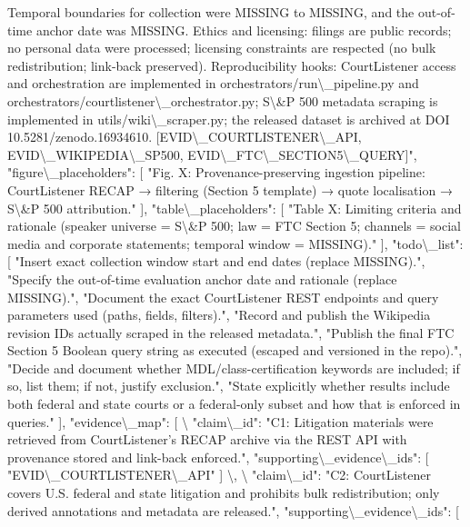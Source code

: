 {Temporal boundaries for collection were MISSING to MISSING, and the out-of-time anchor date was MISSING. Ethics and licensing: filings are public records; no personal data were processed; licensing constraints are respected (no bulk redistribution; link-back preserved). Reproducibility hooks: CourtListener access and orchestration are implemented in orchestrators/run\textbackslash{}_pipeline.py and orchestrators/courtlistener\textbackslash{}_orchestrator.py; S\textbackslash{}&P 500 metadata scraping is implemented in utils/wiki\textbackslash{}_scraper.py; the released dataset is archived at DOI 10.5281/zenodo.16934610. [EVID\textbackslash{}_COURTLISTENER\textbackslash{}_API, EVID\textbackslash{}_WIKIPEDIA\textbackslash{}_SP500, EVID\textbackslash{}_FTC\textbackslash{}_SECTION5\textbackslash{}_QUERY]",
"figure\textbackslash{}_placeholders": [
"Fig. X: Provenance-preserving ingestion pipeline: CourtListener RECAP → filtering (Section 5 template) → quote localisation → S\textbackslash{}&P 500 attribution."
],
"table\textbackslash{}_placeholders": [
"Table X: Limiting criteria and rationale (speaker universe = S\textbackslash{}&P 500; law = FTC Section 5; channels = social media and corporate statements; temporal window = MISSING)."
],
"todo\textbackslash{}_list": [
"Insert exact collection window start and end dates (replace MISSING).",
"Specify the out-of-time evaluation anchor date and rationale (replace MISSING).",
"Document the exact CourtListener REST endpoints and query parameters used (paths, fields, filters).",
"Record and publish the Wikipedia revision IDs actually scraped in the released metadata.",
"Publish the final FTC Section 5 Boolean query string as executed (escaped and versioned in the repo).",
"Decide and document whether MDL/class-certification keywords are included; if so, list them; if not, justify exclusion.",
"State explicitly whether results include both federal and state courts or a federal-only subset and how that is enforced in queries."
],
"evidence\textbackslash{}_map": [
\textbackslash{}{
"claim\textbackslash{}_id": "C1: Litigation materials were retrieved from CourtListener's RECAP archive via the REST API with provenance stored and link-back enforced.",
"supporting\textbackslash{}_evidence\textbackslash{}_ids": [
"EVID\textbackslash{}_COURTLISTENER\textbackslash{}_API"
]
\textbackslash{}},
\textbackslash{}{
"claim\textbackslash{}_id": "C2: CourtListener covers U.S. federal and state litigation and prohibits bulk redistribution; only derived annotations and metadata are released.",
"supporting\textbackslash{}_evidence\textbackslash{}_ids": [
}}
